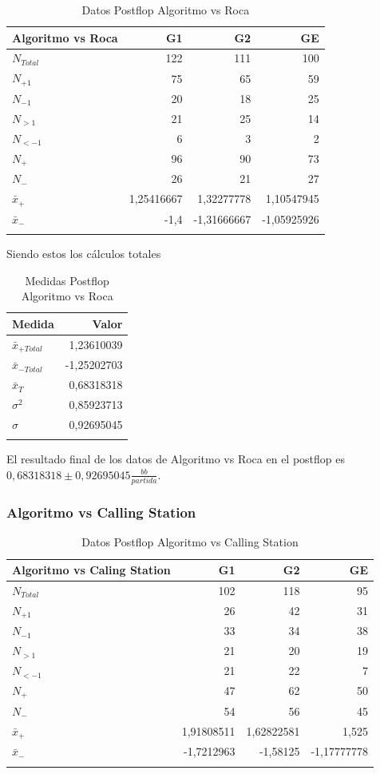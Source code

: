 \begin{longtable}[c]{lrrr}
\hline 
Algoritmo vs Roca & G1 & G2 & GE \\ \hline
$N_{Total}$& 122 & 111 & 100 \\
$N_{+1}$& 75 & 65 & 59 \\
$N_{-1}$ & 20 & 18 & 25 \\
$N_{>1}$& 21 & 25 & 14 \\
$N_{<-1}$& 6 & 3 & 2 \\
$N_{+}$& 96 & 90 & 73 \\
$N_{-}$& 26 & 21 & 27 \\ \hline
$\bar{x}_+$ & 1,25416667 & 1,32277778 & 1,10547945 \\
$\bar{x}_-$& -1,4 & -1,31666667 & -1,05925926 \\ \hline
\caption{Datos Postflop Algoritmo vs Roca}
\label{tab:DPFAvR}
\end{longtable}

Siendo estos los cálculos totales

\begin{longtable}[c]{lr}
\hline 
Medida & Valor \\ \hline 
$\bar{x}_{+Total}$ & 1,23610039 \\
$\bar{x}_{-Total}$ & -1,25202703 \\
$\bar{x}_T$ & 0,68318318 \\
$\sigma^2$ & 0,85923713 \\
$\sigma$ & 0,92695045 \\  \hline
\caption{Medidas Postflop Algoritmo vs Roca}
\label{tab:MPFAvR}
\end{longtable}


El resultado final de los datos de Algoritmo vs Roca en el postflop es  $ 0,68318318\pm 0,92695045 $$\frac{bb}{partida}$.

\newpage

\subsubsection{Algoritmo vs Calling Station}

\begin{longtable}[c]{lrrr}
\hline 
Algoritmo vs Caling Station & G1 & G2 & GE \\ \hline
$N_{Total}$& 102 & 118 & 95 \\
$N_{+1}$& 26 & 42 & 31 \\
$N_{-1}$ & 33 & 34 & 38 \\
$N_{>1}$& 21 & 20 & 19 \\
$N_{<-1}$& 21 & 22 & 7 \\
$N_{+}$& 47 & 62 & 50 \\
$N_{-}$& 54 & 56 & 45 \\ \hline
$\bar{x}_+$ & 1,91808511 & 1,62822581 & 1,525 \\
$\bar{x}_-$& -1,7212963 & -1,58125 & -1,17777778 \\ \hline
\caption{Datos Postflop Algoritmo vs Calling Station}
\label{tab:DPFAvC}
\end{longtable}

